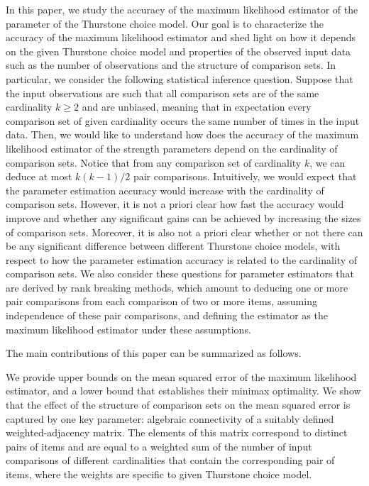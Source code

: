 In this paper, we study the accuracy of the maximum likelihood estimator of the parameter of the Thurstone choice model. Our goal is to characterize the accuracy of the maximum likelihood estimator and shed light on how it depends on the given Thurstone choice model and properties of the observed input data such as the number of observations and the structure of comparison sets. In particular, we consider the following statistical inference question. Suppose that the input observations are such that all comparison sets are of the same cardinality $k\geq 2$ and are unbiased, meaning that in expectation every comparison set of given cardinality occurs the same number of times in the input data. Then, we would like to understand how does the accuracy of the maximum likelihood estimator of the strength parameters depend on the cardinality of comparison sets. Notice that from any comparison set of cardinality $k$, we can deduce at most $k(k-1)/2$ pair comparisons. Intuitively, we would expect that the parameter estimation accuracy would increase with the cardinality of comparison sets. However, it is not a priori clear how fast the accuracy would improve and whether any significant gains can be achieved by increasing the sizes of comparison sets. Moreover, it is also not a priori clear whether or not there can be any significant difference between different Thurstone choice models, with respect to how the parameter estimation accuracy is related to the cardinality of comparison sets. We also consider these questions for parameter estimators that are derived by rank breaking methods, which amount to deducing one or more pair comparisons from each comparison of two or more items, assuming independence of these pair comparisons, and defining the estimator as the maximum likelihood estimator under these assumptions.  

The main contributions of this paper can be summarized as follows. 

We provide upper bounds on the mean squared error of the maximum likelihood estimator, and a lower bound that establishes their minimax optimality. We show that the effect of the structure of comparison sets on the mean squared error is captured by one key parameter: algebraic connectivity of a suitably defined weighted-adjacency matrix. The elements of this matrix correspond to distinct pairs of items and are equal to a weighted sum of the number of input comparisons of different cardinalities that contain the corresponding pair of items, where the weights are specific to given Thurstone choice model. 


